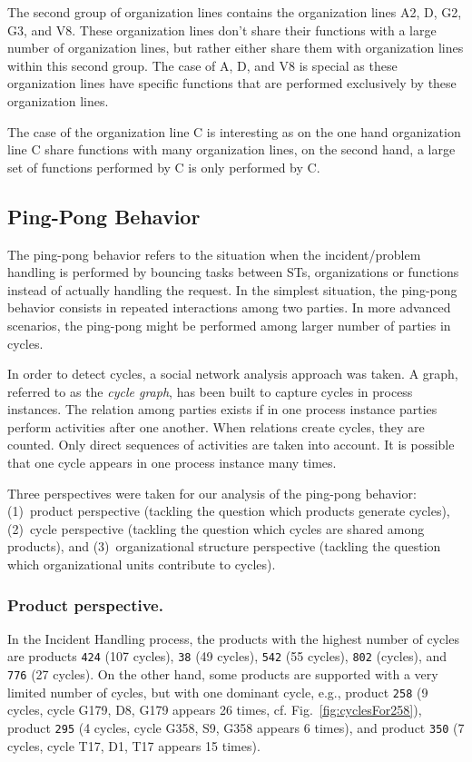 \documentclass[lnbip]{svmultln}
\begin{document}
The second group of organization lines contains the organization lines A2, D, G2, G3, and V8. These organization lines don't share their functions with a large number of organization lines, but rather either share them with organization lines within this second group. The case of A, D, and V8 is special as these organization lines have specific functions that are performed exclusively by these organization lines.

The case of the organization line C is interesting as on the one hand organization line C share functions with many organization lines, on the second hand, a large set of functions performed by C is only performed by C.

\subsection{Ping-Pong Behavior}

The ping-pong behavior refers to the situation when the incident/problem handling is performed by bouncing tasks between STs, organizations or functions instead of actually handling the request. In the simplest situation, the ping-pong behavior consists in repeated interactions among two parties. In more advanced scenarios, the ping-pong might be performed among larger number of parties in cycles.

In order to detect cycles, a social network analysis approach was taken. A graph, referred to as the \emph{cycle graph}, has been built to capture cycles in process instances. The relation among parties exists if in one process instance parties perform activities after one another. When relations create cycles, they are counted. Only direct sequences of activities are taken into account. It is possible that one cycle appears in one process instance many times. 

Three perspectives were taken for our analysis of the ping-pong behavior: (1)~product perspective (tackling the question which products generate cycles), (2)~cycle perspective (tackling the question which cycles are shared among products), and (3)~organizational structure perspective (tackling the question which organizational units contribute to cycles). 

\subsubsection{Product perspective.} In the Incident Handling process, the products with the highest number of cycles are products \texttt{424} (107 cycles), \texttt{38} (49 cycles), \texttt{542} (55 cycles), \texttt{802} (cycles), and \texttt{776} (27 cycles). On the other hand, some products are supported with a very limited number of cycles, but with one dominant cycle, e.g., product \texttt{258} (9 cycles, cycle G179, D8, G179 appears 26 times, cf. Fig.~\ref{fig:cyclesFor258}), product \texttt{295} (4 cycles, cycle G358, S9, G358 appears 6 times), and product \texttt{350} (7 cycles, cycle T17, D1, T17 appears 15 times).
\end{document}

